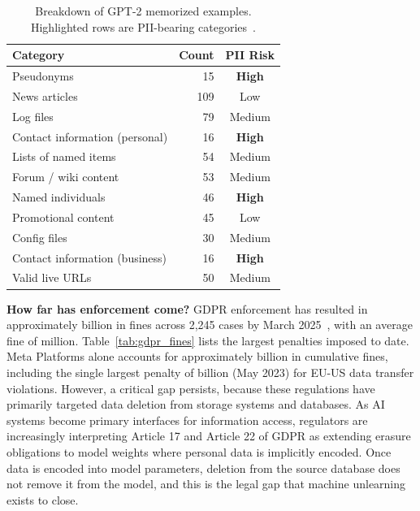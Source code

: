 \begin{table}[htbp]
\centering
\caption{Breakdown of GPT-2 memorized examples. Highlighted rows are PII-bearing categories~\citeauthor{carlini2021extracting}.}
\label{tab:gpt2_memorized}
\begin{tabular}{lrc}
\toprule
\textbf{Category} & \textbf{Count} & \textbf{PII Risk} \\
\midrule
\rowcolor{orange!15} Pseudonyms & 15 & \textbf{High} \\
News articles & 109 & Low \\
Log files & 79 & Medium \\
\rowcolor{orange!15} Contact information (personal) & 16 & \textbf{High} \\
Lists of named items & 54 & Medium \\
Forum / wiki content & 53 & Medium \\
\rowcolor{orange!15} Named individuals & 46 & \textbf{High} \\
Promotional content & 45 & Low \\
Config files & 30 & Medium \\
\rowcolor{orange!15} Contact information (business) & 16 & \textbf{High} \\
Valid live URLs & 50 & Medium \\
\bottomrule
\end{tabular}
\end{table}

\textbf{How far has enforcement come?} GDPR enforcement has resulted in approximately  billion in fines across 2,245 cases by March 2025~\citeauthor{cms2026gdpr}, with an average fine of  million. Table~\ref{tab:gdpr_fines} lists the largest penalties imposed to date. Meta Platforms alone accounts for approximately  billion in cumulative fines, including the single largest penalty of  billion (May 2023) for EU-US data transfer violations. However, a critical gap persists, because these regulations have primarily targeted data deletion from storage systems and databases. As AI systems become primary interfaces for information access, regulators are increasingly interpreting Article 17 and Article 22 of GDPR as extending erasure obligations to model weights where personal data is implicitly encoded. Once data is encoded into model parameters, deletion from the source database does not remove it from the model, and this is the legal gap that machine unlearning exists to close.

